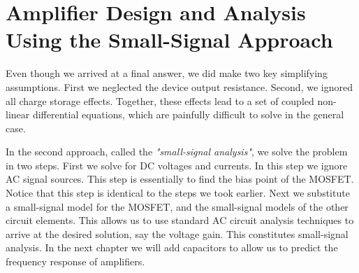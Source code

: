 \section{Amplifier Design and Analysis Using the Small-Signal Approach}
Even though we arrived at a final answer, we did make two key simplifying assumptions.  First we neglected the device output resistance.  Second, we ignored all charge storage effects.  Together, these effects lead to a set of coupled non-linear differential equations, which are painfully difficult to solve in the general case.

In the second approach, called the \textit{"small-signal analysis"}, we solve the problem in two steps.  First we solve for DC voltages and currents.  In this step we ignore AC signal sources.  This step is essentially to find the bias point of the MOSFET.  Notice that this step is identical to the steps we took earlier.  Next we substitute a small-signal model for the MOSFET, and the small-signal models of the other circuit elements.  This allows us to use standard AC circuit analysis techniques to arrive at the desired solution, say the voltage gain. This constitutes small-signal analysis.  In the next chapter we will add capacitors to allow us to predict the frequency response of amplifiers.
